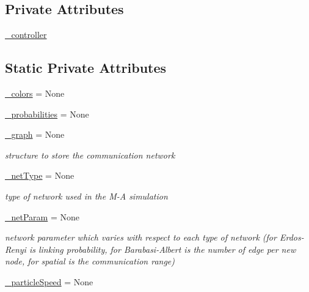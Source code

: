 \subsection*{Private Attributes}
\begin{DoxyCompactItemize}
\item 
\hyperlink{class_mu_mo_t_1_1_mu_mo_t_1_1_mu_mo_tmultiagent_view_a15f56ca9811d1e67d721fa64f9b0dc1e}{\+\_\+controller}
\end{DoxyCompactItemize}
\subsection*{Static Private Attributes}
\begin{DoxyCompactItemize}
\item 
\hyperlink{class_mu_mo_t_1_1_mu_mo_t_1_1_mu_mo_tmultiagent_view_a6aaed74c935ed5380691798f75527a18}{\+\_\+colors} = None
\item 
\hyperlink{class_mu_mo_t_1_1_mu_mo_t_1_1_mu_mo_tmultiagent_view_aaf2c34c5022e4e3c872dbee11e50ea9b}{\+\_\+probabilities} = None
\item 
\hyperlink{class_mu_mo_t_1_1_mu_mo_t_1_1_mu_mo_tmultiagent_view_a752f43042d51a40fed348b434aad0fd8}{\+\_\+graph} = None
\begin{DoxyCompactList}\small\item\em structure to store the communication network \end{DoxyCompactList}\item 
\hyperlink{class_mu_mo_t_1_1_mu_mo_t_1_1_mu_mo_tmultiagent_view_a7d10cd5e301b167444880f57705e2b9e}{\+\_\+net\+Type} = None
\begin{DoxyCompactList}\small\item\em type of network used in the M-\/A simulation \end{DoxyCompactList}\item 
\hyperlink{class_mu_mo_t_1_1_mu_mo_t_1_1_mu_mo_tmultiagent_view_a187bc5499c4da612a9290851be253050}{\+\_\+net\+Param} = None
\begin{DoxyCompactList}\small\item\em network parameter which varies with respect to each type of network (for Erdos-\/\+Renyi is linking probability, for Barabasi-\/\+Albert is the number of edge per new node, for spatial is the communication range) \end{DoxyCompactList}\item 
\hyperlink{class_mu_mo_t_1_1_mu_mo_t_1_1_mu_mo_tmultiagent_view_a957e6b462fc11cb442a866d5b61367a0}{\+\_\+particle\+Speed} = None

\end{DoxyCompactItemize}
